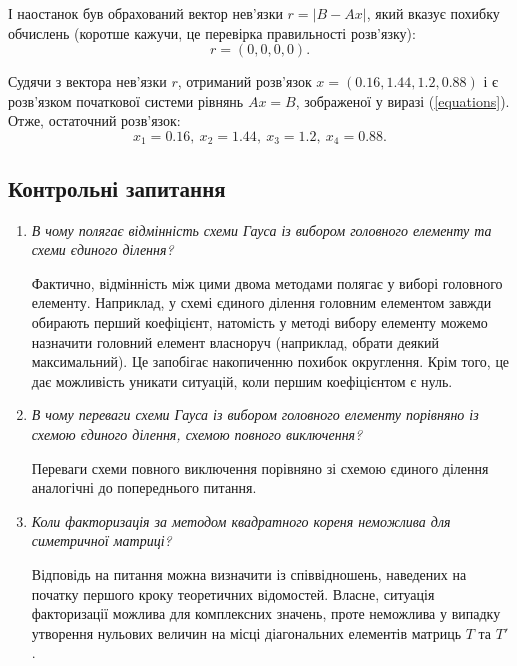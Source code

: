 \documentclass[a4paper,14pt]{extarticle} %
\begin{document}
І наостанок був обрахований вектор нев'язки $r=|B-Ax|$, 
який вказує похибку обчислень (коротше кажучи, це перевірка правильності розв'язку):
\[ r =  (0, 0, 0, 0). \]

Судячи з вектора нев'язки $r$, отриманий розв'язок 
$x=(0.16, 1.44, 1.2, 0.88)$ і є розв'язком початкової 
системи рівнянь $Ax=B$, зображеної у виразі (\ref{equations}).
Отже, остаточний розв'язок: 
\[ x_1=0.16,\ x_2=1.44,\ x_3=1.2,\ x_4=0.88. \]

\subsection*{Контрольні запитання}

\begin{enumerate}
    \item \textit{В чому полягає відмінність схеми Гауса із вибором головного елементу та схеми єдиного ділення?}

    Фактично, відмінність між цими двома методами полягає у виборі головного елементу. Наприклад, у 
    схемі єдиного ділення головним елементом завжди обирають перший коефіцієнт, натомість у методі 
    вибору елементу можемо назначити головний елемент власноруч (наприклад, обрати деякий максимальний). 
    Це запобігає накопиченню похибок округлення. Крім того, це дає можливість уникати ситуацій, 
    коли першим коефіцієнтом є нуль.

    \newpage \item \textit{В чому переваги схеми Гауса із вибором головного елементу порівняно із 
    схемою єдиного ділення, схемою повного виключення?}

    Переваги схеми повного виключення порівняно зі схемою єдиного ділення аналогічні до попереднього питання.

    \item \textit{Коли факторизація за методом квадратного кореня неможлива для симетричної матриці?}

    Відповідь на питання можна визначити із співвідношень, наведених на початку першого кроку теоретичних 
    відомостей. Власне, ситуація факторизації можлива для комплексних значень, проте неможлива у випадку 
    утворення нульових величин на місці діагональних елементів матриць $T$ та $T'$.
\end{enumerate}
\end{document}
